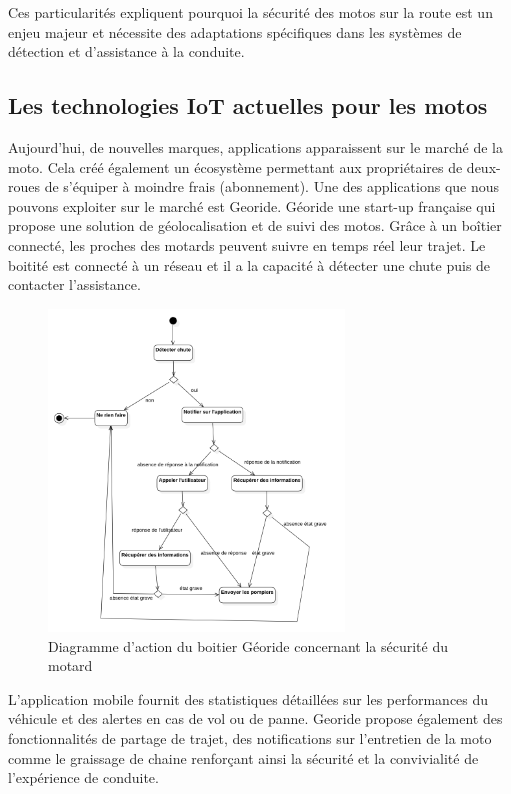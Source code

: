 \documentclass{article}
\begin{document}
\vspace{0.5cm} %
Ces particularités expliquent pourquoi la sécurité des motos sur la route est un enjeu majeur et nécessite des adaptations spécifiques dans les systèmes de détection et d’assistance à la conduite. 

\subsection{Les technologies IoT actuelles pour les motos}
Aujourd'hui, de nouvelles marques, applications\cite{iot_accessoire_moto} apparaissent sur le marché de la moto. Cela créé également un écosystème permettant aux propriétaires de deux-roues de s'équiper à moindre frais (abonnement). Une des applications que nous pouvons exploiter sur le marché est Georide. Géoride une start-up française qui propose une solution de géolocalisation et de suivi des motos. Grâce à un boîtier connecté, les proches des motards peuvent suivre en temps réel leur trajet. Le boitité est connecté à un réseau et il a la capacité à détecter une chute puis de contacter l'assistance. 
\begin{figure}[H]
    \centering
    \includegraphics[width=0.7\textwidth]{images/diag_etat_georide.png} 
    \caption{Diagramme d'action du boitier Géoride concernant la sécurité du motard}
\end{figure}
L’application mobile fournit des statistiques détaillées sur les performances du véhicule et des alertes en cas de vol ou de panne. Georide propose également des fonctionnalités de partage de trajet, des notifications sur l'entretien de la moto comme le graissage de chaine renforçant ainsi la sécurité et la convivialité de l’expérience de conduite.
\end{document}

